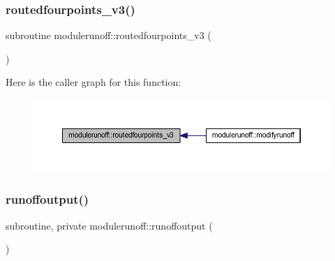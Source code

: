 \mbox{\label{namespacemodulerunoff_a7ca1b43ca23fdb3f25a304ec7ea33a92}} 
\subsubsection{\texorpdfstring{routedfourpoints\+\_\+v3()}{routedfourpoints\_v3()}}
{\footnotesize\ttfamily subroutine modulerunoff\+::routedfourpoints\+\_\+v3 (\begin{DoxyParamCaption}{ }\end{DoxyParamCaption})\hspace{0.3cm}{\ttfamily [private]}}

Here is the caller graph for this function\+:
\nopagebreak
\begin{figure}[H]
\begin{center}
\leavevmode
\includegraphics[width=350pt]{namespacemodulerunoff_a7ca1b43ca23fdb3f25a304ec7ea33a92_icgraph}
\end{center}
\end{figure}
\mbox{\label{namespacemodulerunoff_af0c6bd2433c33b62204214405fa2bd23}} 
\subsubsection{\texorpdfstring{runoffoutput()}{runoffoutput()}}
{\footnotesize\ttfamily subroutine, private modulerunoff\+::runoffoutput (\begin{DoxyParamCaption}{ }\end{DoxyParamCaption})\hspace{0.3cm}{\ttfamily [private]}}

